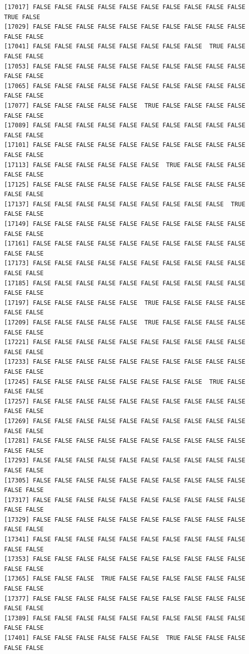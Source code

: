 \documentclass[
  a4paper,
  DIV=11,
  numbers=noendperiod]{scrartcl}
\begin{document}
\begin{verbatim}
[17017] FALSE FALSE FALSE FALSE FALSE FALSE FALSE FALSE FALSE FALSE  TRUE FALSE
[17029] FALSE FALSE FALSE FALSE FALSE FALSE FALSE FALSE FALSE FALSE FALSE FALSE
[17041] FALSE FALSE FALSE FALSE FALSE FALSE FALSE FALSE  TRUE FALSE FALSE FALSE
[17053] FALSE FALSE FALSE FALSE FALSE FALSE FALSE FALSE FALSE FALSE FALSE FALSE
[17065] FALSE FALSE FALSE FALSE FALSE FALSE FALSE FALSE FALSE FALSE FALSE FALSE
[17077] FALSE FALSE FALSE FALSE FALSE  TRUE FALSE FALSE FALSE FALSE FALSE FALSE
[17089] FALSE FALSE FALSE FALSE FALSE FALSE FALSE FALSE FALSE FALSE FALSE FALSE
[17101] FALSE FALSE FALSE FALSE FALSE FALSE FALSE FALSE FALSE FALSE FALSE FALSE
[17113] FALSE FALSE FALSE FALSE FALSE FALSE  TRUE FALSE FALSE FALSE FALSE FALSE
[17125] FALSE FALSE FALSE FALSE FALSE FALSE FALSE FALSE FALSE FALSE FALSE FALSE
[17137] FALSE FALSE FALSE FALSE FALSE FALSE FALSE FALSE FALSE  TRUE FALSE FALSE
[17149] FALSE FALSE FALSE FALSE FALSE FALSE FALSE FALSE FALSE FALSE FALSE FALSE
[17161] FALSE FALSE FALSE FALSE FALSE FALSE FALSE FALSE FALSE FALSE FALSE FALSE
[17173] FALSE FALSE FALSE FALSE FALSE FALSE FALSE FALSE FALSE FALSE FALSE FALSE
[17185] FALSE FALSE FALSE FALSE FALSE FALSE FALSE FALSE FALSE FALSE FALSE FALSE
[17197] FALSE FALSE FALSE FALSE FALSE  TRUE FALSE FALSE FALSE FALSE FALSE FALSE
[17209] FALSE FALSE FALSE FALSE FALSE  TRUE FALSE FALSE FALSE FALSE FALSE FALSE
[17221] FALSE FALSE FALSE FALSE FALSE FALSE FALSE FALSE FALSE FALSE FALSE FALSE
[17233] FALSE FALSE FALSE FALSE FALSE FALSE FALSE FALSE FALSE FALSE FALSE FALSE
[17245] FALSE FALSE FALSE FALSE FALSE FALSE FALSE FALSE  TRUE FALSE FALSE FALSE
[17257] FALSE FALSE FALSE FALSE FALSE FALSE FALSE FALSE FALSE FALSE FALSE FALSE
[17269] FALSE FALSE FALSE FALSE FALSE FALSE FALSE FALSE FALSE FALSE FALSE FALSE
[17281] FALSE FALSE FALSE FALSE FALSE FALSE FALSE FALSE FALSE FALSE FALSE FALSE
[17293] FALSE FALSE FALSE FALSE FALSE FALSE FALSE FALSE FALSE FALSE FALSE FALSE
[17305] FALSE FALSE FALSE FALSE FALSE FALSE FALSE FALSE FALSE FALSE FALSE FALSE
[17317] FALSE FALSE FALSE FALSE FALSE FALSE FALSE FALSE FALSE FALSE FALSE FALSE
[17329] FALSE FALSE FALSE FALSE FALSE FALSE FALSE FALSE FALSE FALSE FALSE FALSE
[17341] FALSE FALSE FALSE FALSE FALSE FALSE FALSE FALSE FALSE FALSE FALSE FALSE
[17353] FALSE FALSE FALSE FALSE FALSE FALSE FALSE FALSE FALSE FALSE FALSE FALSE
[17365] FALSE FALSE FALSE  TRUE FALSE FALSE FALSE FALSE FALSE FALSE FALSE FALSE
[17377] FALSE FALSE FALSE FALSE FALSE FALSE FALSE FALSE FALSE FALSE FALSE FALSE
[17389] FALSE FALSE FALSE FALSE FALSE FALSE FALSE FALSE FALSE FALSE FALSE FALSE
[17401] FALSE FALSE FALSE FALSE FALSE FALSE  TRUE FALSE FALSE FALSE FALSE FALSE

\end{verbatim}
\end{document}
